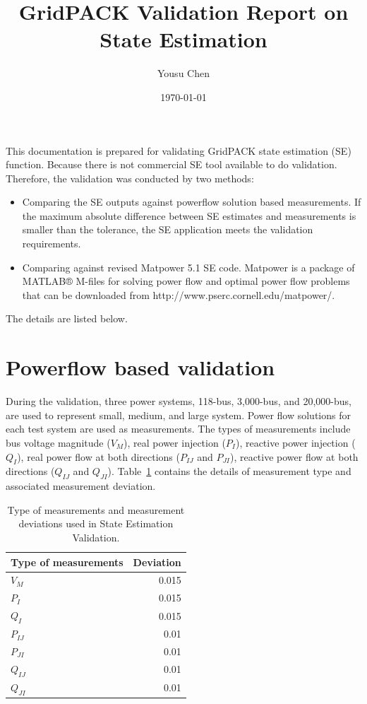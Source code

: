 \documentclass[a4paper]{article}
\title{GridPACK Validation Report on State Estimation}
\author{Yousu Chen}
\date{\today}
\begin{document}
\maketitle

This documentation is prepared for validating GridPACK state estimation (SE) function. Because there is not commercial SE tool available to do validation. Therefore, the validation was conducted by two methods: 
\begin{itemize}
  \item Comparing the SE outputs against powerflow solution based measurements. If the maximum absolute difference between SE estimates and measurements is smaller than the tolerance, the SE application meets the validation requirements.  
  \item Comparing against revised Matpower 5.1 SE code. Matpower is a package of MATLAB® M-files for solving power flow and optimal power flow problems that can be downloaded from http://www.pserc.cornell.edu/matpower/.  
\end{itemize}

The details are listed below.

\section{Powerflow based validation}


During the validation, three power systems, 118-bus, 3,000-bus, and 20,000-bus, are used to represent small, medium, and large system. Power flow solutions for each test system are used as measurements. The types of measurements include bus voltage magnitude ($V_M$), real power injection ($P_I$), reactive power injection ($Q_I$), real power flow at both directions ($P_{IJ}$ and $P_{JI}$), reactive power flow at both directions ($Q_{IJ}$ and $Q_{JI}$). Table~\ref{tab:SE}  contains the details of measurement type and associated measurement deviation.

\begin{table} [h]
\centering
\begin{tabular}{l|r}
Type of measurements & Deviation \\\hline
$V_M$	& 0.015 \\
$P_I$	& 0.015 \\
$Q_I$	& 0.015 \\
$P_{IJ}$	& 0.01 \\
$P_{JI}$	& 0.01 \\
$Q_{IJ}$	& 0.01 \\
$Q_{JI}$	& 0.01

\end{tabular}
\caption{\label{tab:SE}Type of measurements and measurement deviations used in State Estimation Validation.}
\end{table}
\end{document}
